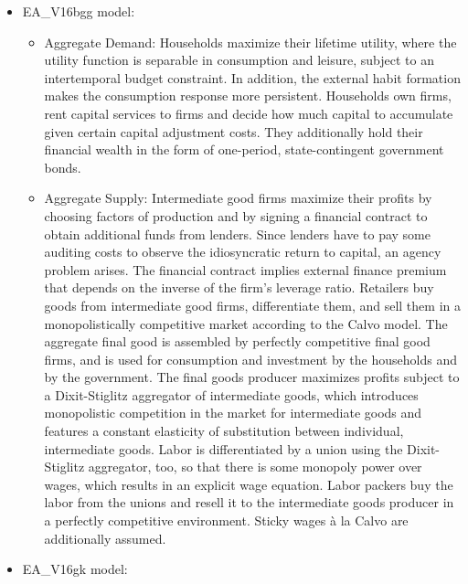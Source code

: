 \documentclass[11pt,a4paper]{article}
\begin{document}
	
	\begin{itemize}
		
		\item EA\_V16bgg model:
		
		\begin{itemize}	
			
			\item Aggregate Demand: Households maximize their lifetime utility, where the utility function is separable in consumption and leisure, subject to an intertemporal budget constraint. In addition, the external habit formation makes the consumption response more persistent. Households own firms, rent capital services to firms and decide how much capital to accumulate given certain capital adjustment costs. They additionally hold their financial wealth in the form of one-period, state-contingent government bonds.
			
			\item Aggregate Supply: Intermediate good firms maximize their profits by choosing factors of production and by signing a financial contract to obtain additional funds from lenders. Since lenders have to pay some auditing costs to observe the idiosyncratic return to capital, an agency problem arises. The financial contract implies external finance premium that depends on the inverse of the firm's leverage ratio. Retailers buy goods from intermediate good firms, differentiate them, and sell them in a monopolistically competitive market according to the Calvo model. The aggregate final good is assembled by perfectly competitive final good firms, and is used for consumption and investment by the households and by the government. The final goods producer maximizes profits subject to a Dixit-Stiglitz aggregator of intermediate goods, which introduces monopolistic competition in the market for intermediate goods and features a constant elasticity of substitution between individual, intermediate goods. Labor is differentiated by a union using the Dixit-Stiglitz aggregator, too, so that there is some monopoly power over wages, which results in an explicit wage equation. Labor packers buy the labor from the unions and resell it to the intermediate goods producer in a perfectly competitive environment. Sticky wages \`{a}  la Calvo are additionally assumed. 
			
		\end{itemize}
		
		\item EA\_V16gk model:
		
		
		\begin{itemize}	
			

\end{itemize}
\end{itemize}
\end{document}
